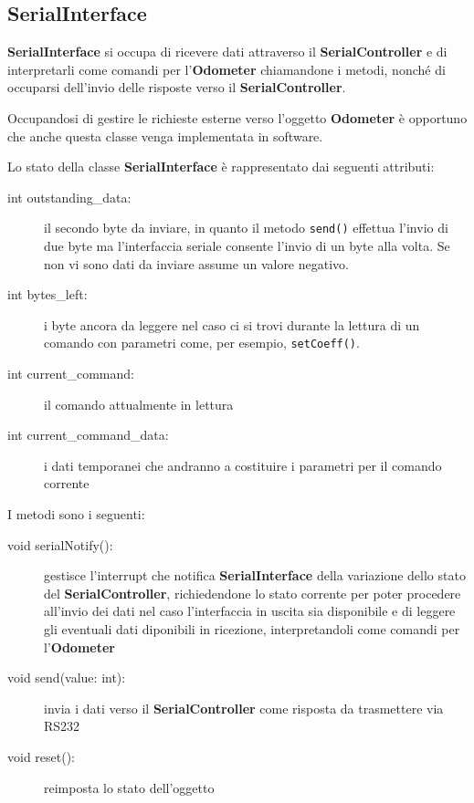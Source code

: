 \documentclass [11pt,a4paper,oneside]{paper}
\newcommand{\component}[1]{\textbf{#1}}
\newcommand{\identifier}[1]{\texttt{#1}}
\begin{document}
\subsection{SerialInterface}
\component{SerialInterface} si occupa di ricevere dati attraverso il
\component{SerialController} e di interpretarli come comandi per
l'\component{Odometer} chiamandone i metodi, nonché di occuparsi
dell'invio delle risposte verso il \component{SerialController}.

Occupandosi di gestire le richieste esterne verso l'oggetto
\component{Odometer} è opportuno che anche questa classe venga
implementata in software.

Lo stato della classe \component{SerialInterface} è rappresentato
dai seguenti attributi:

\begin{description}
\item[int outstanding\_data:] il secondo byte da inviare, in quanto
    il metodo \identifier{send()} effettua l'invio di due byte ma
    l'interfaccia seriale consente l'invio di un byte alla volta.
    Se non vi sono dati da inviare assume un valore negativo.
\item[int bytes\_left:] i byte ancora da leggere nel caso ci
    si trovi durante la lettura di un comando con parametri
    come, per esempio, \identifier{setCoeff()}.
\item[int current\_command:] il comando attualmente in lettura
\item[int current\_command\_data:] i dati temporanei che andranno
    a costituire i parametri per il comando corrente
\end{description}

I metodi sono i seguenti:

\begin{description}
\item[void serialNotify():] gestisce l'interrupt che notifica
    \component{SerialInterface} della variazione dello stato del
    \component{SerialController}, richiedendone lo stato corrente
    per poter procedere all'invio dei dati nel caso l'interfaccia
    in uscita sia disponibile e di leggere gli eventuali dati
    diponibili in ricezione, interpretandoli come comandi per
    l'\component{Odometer}
\item[void send(value: int):] invia i dati verso il
    \component{SerialController} come risposta da trasmettere via RS232
\item[void reset():] reimposta lo stato dell'oggetto
\end{description}
\end{document}
